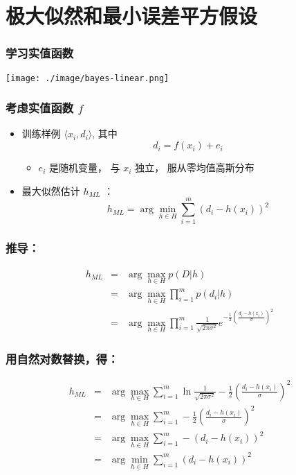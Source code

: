 \documentclass{beamer}
\begin{document}
\section{极大似然和最小误差平方假设}
\label{sec-4}
\begin{frame}
\frametitle{学习实值函数}
\label{sec-4-1}

\texttt{[image: ./image/bayes-linear.png]}
\end{frame}
\begin{frame}
\frametitle{考虑实值函数 $f$}
\label{sec-4-2}

\begin{itemize}
\item 训练样例 $\langle x_{i}, d_{i} \rangle$, 其中
   $$d_{i} = f(x_{i}) + e_{i}$$
\begin{itemize}
\item $e_{i}$ 是随机变量， 与 $x_{i}$ 独立， 服从零均值高斯分布
\end{itemize}
\item 最大似然估计 $h_{ML}$ ：
  $$h_{ML} = \arg \min_{h \in H} \sum_{i=1}^{m} \left(d_{i} -h(x_{i})\right)^{2}$$
\end{itemize}
\end{frame}
\begin{frame}
\frametitle{推导：}
\label{sec-4-3}


\begin{eqnarray}
h_{ML} &= &\arg \max_{h \in H} p(D|h) \nonumber \\
 &= &\arg \max_{h \in H} \prod_{i=1}^{m} p(d_{i}|h) \nonumber \\
&= &\arg \max_{h \in H} \prod_{i=1}^{m} \frac{1}{\sqrt{2 \pi \sigma^{2}}}
e^{-\frac{1}{2}(\frac{d_{i} - h(x_{i})}{\sigma})^{2}} \nonumber
\end{eqnarray}
\end{frame}
\begin{frame}
\frametitle{用自然对数替换，得：}
\label{sec-4-4}


\begin{eqnarray}
h_{ML}  &= &\arg \max_{h \in H}
\sum_{i=1}^{m} \ln \frac{1}{\sqrt{2 \pi \sigma^{2}}} -
\frac{1}{2}\left(\frac{d_{i} - h(x_{i})}{\sigma}\right)^{2} \nonumber \\
  &= &\arg \max_{h \in H} \sum_{i=1}^{m} -
\frac{1}{2}\left(\frac{d_{i} - h(x_{i})}{\sigma}\right)^{2} \nonumber \\
 &= &\arg \max_{h \in H} \sum_{i=1}^{m} - \left(d_{i} - h(x_{i})\right)^{2}
 \nonumber \\
 &= &\arg \min_{h \in H} \sum_{i=1}^{m} \left(d_{i} - h(x_{i})\right)^{2}  \nonumber
\end{eqnarray}
\end{frame}
\end{document}
